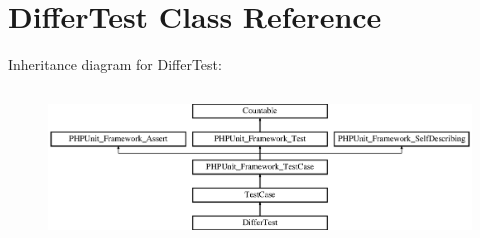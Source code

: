 \hypertarget{class_sebastian_bergmann_1_1_diff_1_1_differ_test}{}\section{Differ\+Test Class Reference}
\label{class_sebastian_bergmann_1_1_diff_1_1_differ_test}
Inheritance diagram for Differ\+Test\+:\begin{figure}[H]
\begin{center}
\leavevmode
\includegraphics[height=4.129793cm]{class_sebastian_bergmann_1_1_diff_1_1_differ_test}
\end{center}
\end{figure}
